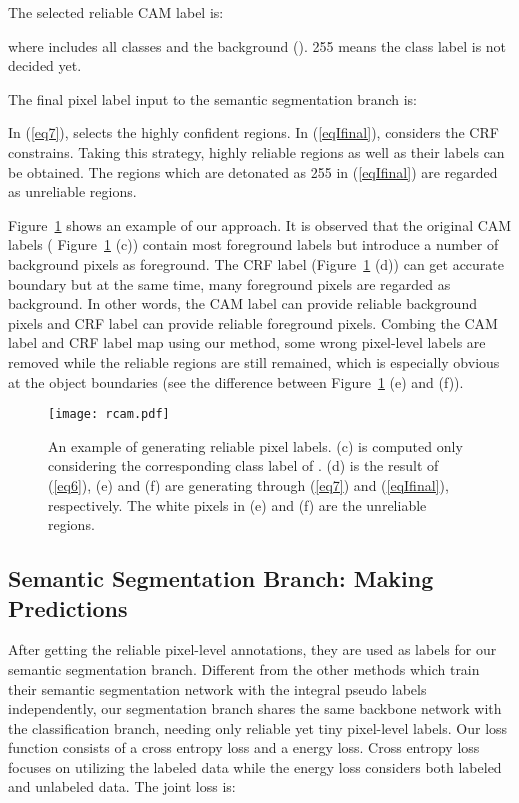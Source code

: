 \documentclass[letterpaper]{article} \usepackage{aaai20}  \usepackage{times}  \usepackage{helvet} \usepackage{courier}  \usepackage[hyphens]{url}  \usepackage{graphicx} \urlstyle{rm} \def\UrlFont{\rm}  \usepackage{graphicx}  \frenchspacing  \setlength{\pdfpagewidth}{8.5in}  \setlength{\pdfpageheight}{11in}
\begin{document}
The selected reliable CAM label is:

where  includes all classes and the background (). 255 means the class label is not decided yet.

The final pixel label input to the semantic segmentation branch is:


In (\ref{eq7}),  selects the highly confident regions. In (\ref{eqIfinal}),  considers the CRF constrains. Taking this strategy, highly reliable regions as well as their labels can be obtained. The regions which are detonated as 255 in (\ref{eqIfinal}) are regarded as unreliable regions.

Figure~\ref{rcam} shows an example of our approach. It is observed that the original CAM labels ( Figure~\ref{rcam} (c)) contain most foreground labels but introduce a number of background pixels as foreground. The CRF label (Figure~\ref{rcam} (d)) can get accurate boundary but at the same time, many foreground pixels are regarded as background. In other words, the CAM label can provide reliable background pixels and CRF label can provide reliable foreground pixels. Combing the CAM label and CRF label map using our method, some wrong pixel-level labels are removed while the reliable regions are still remained, which is especially obvious at the object boundaries (see the difference between Figure~\ref{rcam} (e) and (f)).

\begin{figure}[!htb]
	\centering
	\texttt{[image: rcam.pdf]}
	\caption{An example of generating reliable pixel labels. (c) is computed only considering the corresponding class label of . (d) is the result of (\ref{eq6}), (e) and (f) are generating through (\ref{eq7}) and (\ref{eqIfinal}), respectively. The white pixels in (e) and (f) are the unreliable regions.}
	\label{rcam}
\end{figure}

\subsection{Semantic Segmentation Branch: Making Predictions }\label{sec3.3}

After getting the reliable pixel-level annotations, they are used as labels for our semantic segmentation branch. Different from the other methods which train their semantic segmentation network with the integral pseudo labels independently, our segmentation branch shares the same backbone network with the classification branch, needing only reliable yet tiny pixel-level labels. Our loss function consists of a cross entropy loss and a energy loss. Cross entropy loss focuses on utilizing the labeled data while the energy loss considers both labeled and unlabeled data. The joint loss is:
\end{document}

